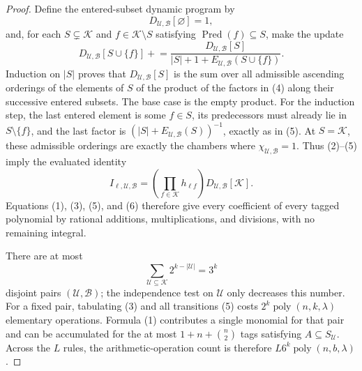 \documentclass{article}
\begin{document}
\begin{proof}
Define the entered-subset dynamic program by
\[
 D_{\mathcal U,\mathcal B}[\varnothing]=1,
\]
and, for each \(S\subsetneq\mathcal K\) and \(f\in\mathcal K\setminus S\) satisfying \(\operatorname{Pred}(f)\subseteq S\), make the update
\[
 D_{\mathcal U,\mathcal B}[S\cup\{f\}]
 \mathrel{+}=
 \frac{D_{\mathcal U,\mathcal B}[S]}
 {|S|+1+E_{\mathcal U,\mathcal B}(S\cup\{f\})}.                              \tag{5}
\]
Induction on \(|S|\) proves that \(D_{\mathcal U,\mathcal B}[S]\) is the sum over all admissible ascending orderings of the elements of \(S\) of the product of the factors in (4) along their successive entered subsets.  The base case is the empty product.  For the induction step, the last entered element is some \(f\in S\), its predecessors must already lie in \(S\setminus\{f\}\), and the last factor is \((|S|+E_{\mathcal U,\mathcal B}(S))^{-1}\), exactly as in (5).  At \(S=\mathcal K\), these admissible orderings are exactly the chambers where \(\chi_{\mathcal U,\mathcal B}=1\).  Thus (2)--(5) imply the evaluated identity
\[
 I_{\ell,\mathcal U,\mathcal B}
 =\left(\prod_{f\in\mathcal K}h_{\ell f}\right)
 D_{\mathcal U,\mathcal B}[\mathcal K].                                      \tag{6}
\]
Equations (1), (3), (5), and (6) therefore give every coefficient of every tagged polynomial by rational additions, multiplications, and divisions, with no remaining integral.

There are at most
\[
 \sum_{\mathcal U\subseteq\mathcal K}2^{k-|\mathcal U|}=3^k
\]
disjoint pairs \((\mathcal U,\mathcal B)\); the independence test on \(\mathcal U\) only decreases this number.  For a fixed pair, tabulating (3) and all transitions (5) costs \(2^k\operatorname{poly}(n,k,\lambda)\) elementary operations.  Formula (1) contributes a single monomial for that pair and can be accumulated for the at most \(1+n+\binom n2\) tags satisfying \(A\subseteq S_{\mathcal U}\).  Across the \(L\) rules, the arithmetic-operation count is therefore \(L6^k\operatorname{poly}(n,b,\lambda)\).


\end{proof}
\end{document}
